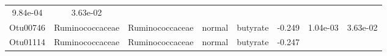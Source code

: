 \documentclass[11pt,]{article}
\begin{document}
\begin{longtable}[]{@{}cccccccc@{}}
\begin{minipage}[t]{0.08\columnwidth}
9.84e-04\strut
\end{minipage} & \begin{minipage}[t]{0.08\columnwidth}\centering\strut
3.63e-02\strut
\end{minipage}\tabularnewline
\begin{minipage}[t]{0.08\columnwidth}\centering\strut
Otu00746\strut
\end{minipage} & \begin{minipage}[t]{0.15\columnwidth}\centering\strut
Ruminococcaceae\strut
\end{minipage} & \begin{minipage}[t]{0.15\columnwidth}\centering\strut
Ruminococcaceae\strut
\end{minipage} & \begin{minipage}[t]{0.08\columnwidth}\centering\strut
normal\strut
\end{minipage} & \begin{minipage}[t]{0.09\columnwidth}\centering\strut
butyrate\strut
\end{minipage} & \begin{minipage}[t]{0.07\columnwidth}\centering\strut
-0.249\strut
\end{minipage} & \begin{minipage}[t]{0.08\columnwidth}\centering\strut
1.04e-03\strut
\end{minipage} & \begin{minipage}[t]{0.08\columnwidth}\centering\strut
3.63e-02\strut
\end{minipage}\tabularnewline
\begin{minipage}[t]{0.08\columnwidth}\centering\strut
Otu01114\strut
\end{minipage} & \begin{minipage}[t]{0.15\columnwidth}\centering\strut
Ruminococcaceae\strut
\end{minipage} & \begin{minipage}[t]{0.15\columnwidth}\centering\strut
Ruminococcaceae\strut
\end{minipage} & \begin{minipage}[t]{0.08\columnwidth}\centering\strut
normal\strut
\end{minipage} & \begin{minipage}[t]{0.09\columnwidth}\centering\strut
butyrate\strut
\end{minipage} & \begin{minipage}[t]{0.07\columnwidth}\centering\strut
-0.247\strut
\end{minipage} & \begin{minipage}[t]{0.08\columnwidth}\centering\strut

\end{minipage}
\end{longtable}
\end{document}
